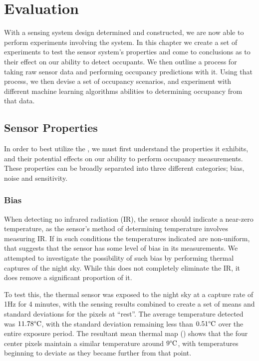\documentclass[../thesis/thesis.tex]{subfiles}
\begin{document}
 \chapter{Evaluation}
 \label{chap:evaluation}

 With a sensing system design determined and constructed, we are now able to perform experiments involving the system. In this chapter we create a set of experiments to test the sensor system's properties and come to conclusions as to their effect on our ability to detect occupants. We then outline a process for taking raw sensor data and performing occupancy predictions with it. Using that process, we then devise a set of occupancy scenarios, and experiment with different machine learning algorithms abilities to determining occupancy from that data.

\section{Sensor Properties}

In order to best utilize the \mlx, we must first understand the properties it exhibits, and their potential effects on our ability to perform occupancy measurements. These properties can be broadly separated into three different categories; bias, noise and sensitivity.

\subsection{Bias}
When detecting no infrared radiation (IR), the sensor should indicate a near-zero temperature, as the sensor's method of determining temperature involves measuring IR. If in such conditions the temperatures indicated are non-uniform, that suggests that the sensor has some level of bias in its measurements. We attempted to investigate the possibility of such bias by performing thermal captures of the night sky. While this does not completely eliminate the IR, it does remove a significant proportion of it.

To test this, the thermal sensor was exposed to the night sky at a capture rate of 1Hz for 4 minutes, with the sensing results combined to create a set of means and standard deviations for the pixels at ``rest''. The average temperature detected was $11.78\degree\textrm{C}$, with the standard deviation remaining less than $0.51\degree\textrm{C}$ over the entire exposure period. The resultant mean thermal map () shows that the four center pixels maintain a similar temperature around $9\degree\textrm{C}$, with temperatures beginning to deviate as they became further from that point.
\end{document}
